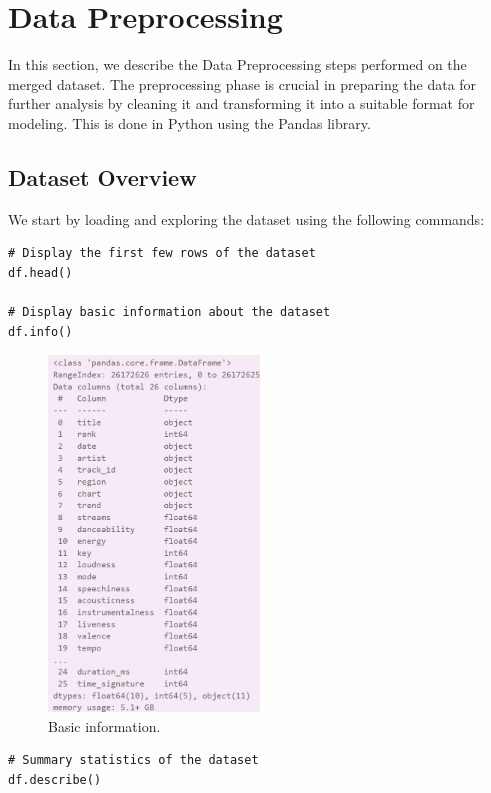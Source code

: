 \chapter{Data Preprocessing}

In this section, we describe the Data Preprocessing steps performed on the merged dataset. The preprocessing phase is crucial in preparing the data for further analysis by cleaning it and transforming it into a suitable format for modeling. This is done in Python using the Pandas library. 

\section{Dataset Overview}

We start by loading and exploring the dataset using the following commands:

\begin{verbatim}
# Display the first few rows of the dataset
df.head()

# Display basic information about the dataset
df.info()
\end{verbatim}

\begin{figure}[h]
    \centering
    \includegraphics[width=0.5\textwidth]{media/info.png} 
    \caption{Basic information.}
    \label{df.info()}
\end{figure}

\newpage
\begin{verbatim}
# Summary statistics of the dataset
df.describe()
\end{verbatim}


